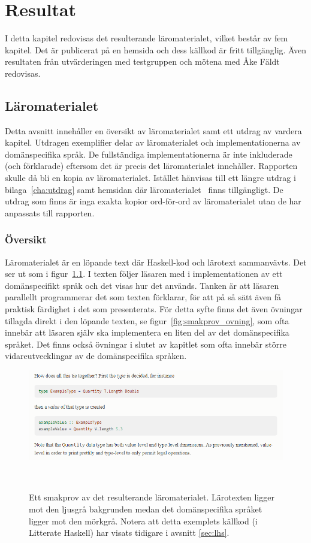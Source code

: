 \chapter{Resultat}

I detta kapitel redovisas det resulterande läromaterialet, vilket består av fem
kapitel. Det är publicerat på en hemsida och dess källkod är fritt tillgänglig.
Även resultaten från utvärderingen med testgruppen och mötena med Åke Fäldt
redovisas.

\section{Läromaterialet}\label{sec:res_laromaterial}

Detta avsnitt innehåller en översikt av läromaterialet samt ett utdrag av
vardera kapitel. Utdragen exemplifier delar av läromaterialet och
implementationerna av domänspecifika språk. De fullständiga implementationerna
är inte inkluderade (och förklarade) eftersom det är precis det läromaterialet
innehåller. Rapporten skulle då bli en kopia av läromaterialet. Istället
hänvisas till ett längre utdrag i bilaga~\ref{cha:utdrag} samt hemsidan där
läromaterialet~\cite{LYAP} finns tillgängligt. De utdrag som finns är inga
exakta kopior ord-för-ord av läromaterialet utan de har anpassats till
rapporten.

\subsection{Översikt}

Läromaterialet är en löpande text där Haskell-kod och lärotext sammanvävts. Det
ser ut som i figur~\ref{fig:smakprov_laromaterial}. I texten följer läsaren med
i implementationen av ett domänspecifikt språk och det visas hur det används.
Tanken är att läsaren parallellt programmerar det som texten förklarar, för att
på så sätt även få praktisk färdighet i det som presenterats. För detta syfte
finns det även övningar tillagda direkt i den löpande texten, se
figur~\ref{fig:smakprov_ovning}, som ofta innebär att läsaren själv ska
implementera en liten del av det domänspecifika språket. Det finns också
övningar i slutet av kapitlet som ofta innebär större vidareutvecklingar av de
domänspecifika språken.

\begin{figure}[tph]
  \centering
  \includegraphics[width=\linewidth]{figure/smakprov_laromaterial.png}
  \caption{Ett smakprov av det resulterande läromaterialet. Lärotexten ligger mot den ljusgrå bakgrunden medan det domänspecifika språket ligger mot den mörkgrå. Notera att detta exemplets källkod (i Litterate Haskell) har visats tidigare i avsnitt \ref{sec:lhs}.}~\label{fig:smakprov_laromaterial}
\end{figure}

